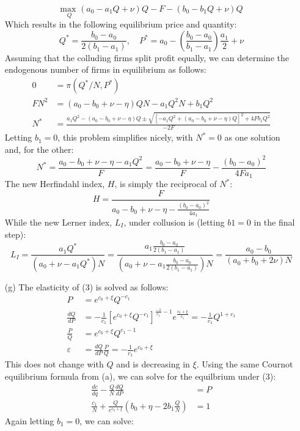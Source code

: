 \documentclass{article}
\newcommand{\usmax}[1]{\underset{#1}{\text{max }}}
\begin{document}
\begin{itemize}
\[      \usmax{Q}(a_0-a_1Q+\nu)Q - F - (b_0-b_1Q + \nu)Q
    \]
    Which results in the following equilibrium price and quantity:\[
      Q^* = \frac{b_0-a_0}{2(b_1-a_1)},\quad P^* = a_0 - \left(\frac{b_0-a_0}{b_1-a_1}\right)\frac{a_1}{2} + \nu
    \]
    Assuming that the colluding firms split profit equally, we can determine the endogenous number of firms in equilibrium as follows:\begin{align*}
      0 &= \pi(Q^*/N,P^*)                                    \\
      FN^2 &= (a_0 - b_0 + \nu - \eta)QN - a_1Q^2N + b_1Q^2 \\
      N^* &= \frac{a_1Q^2-(a_0-b_0+\nu-\eta)Q\pm\sqrt{[-a_1Q^2+(a_0-b_0+\nu-\eta)Q]^2+4Fb_1Q^2}}{-2F}
    \end{align*}
    Letting ${b_1=0}$, this problem simplifies nicely, with $N^*=0$ as one solution and, for the other:\[
      N^* = \frac{a_0 - b_0 + \nu - \eta - a_1Q^2}{F} 
          = \frac{a_0 - b_0 + \nu - \eta}{F} - \frac{(b_0-a_0)^2}{4Fa_1}
    \]
    The new Herfindahl index, $H$, is simply the reciprocal of $N^*$:\[
      H = \frac{F}{a_0-b_0+\nu-\eta - \frac{(b_0-a_0)^2}{4a_1}}
    \]
    While the new Lerner index, $L_I$, under collusion is (letting ${b1=0}$ in the final step):\[
      L_I = \frac{a_1Q^*}{(a_0 + \nu - a_1Q^*)N} = \frac{a_1\frac{b_0-a_0}{2(b_1-a_1)}}{\left(a_0 + \nu - a_1\frac{b_0-a_0}{2(b_1-a_1)}\right)N} = \frac{a_0- b_0}{(a_0 + b_0 + 2\nu)N}
    \]
    \item[(g)] The elasticity of (3) is solved as follows: \begin{align*}
      P &= e^{c_0 + \xi}Q^{-c_1}  \\
      \frac{dQ}{dP} &= -\frac{1}{c_1}\left[e^{c_0 + \xi}Q^{-c_1}\right]^{\frac{-1}{c_1}-1}e^{\frac{c_0+\xi}{c_1}} = -\frac{1}{c_1}Q^{1+c_1} \\
      \frac{P}{Q} &= e^{c_0 + \xi}Q^{c_1-1}     \\
      \varepsilon &= \frac{dQ}{dP}\frac{P}{Q} = -\frac{1}{c_1}e^{c_0 + \xi}
    \end{align*}
    This does not change with $Q$ and is decreasing in $\xi$. Using the same Cournot equilibrium formula from (a), we can solve for the equilbrium under (3):\begin{align*}
      \frac{dc}{dq} - \frac{Q}{N}\frac{dQ}{dP} &= P \\
      \frac{c_1}{N} + \frac{Q}{e^{c_0 + \xi}}\left(b_0+\eta-2b_1\frac{Q}{N}\right) &= 1
    \end{align*}
    Again letting ${b_1=0}$, we can solve:\[
\]
\end{itemize}
\end{document}
